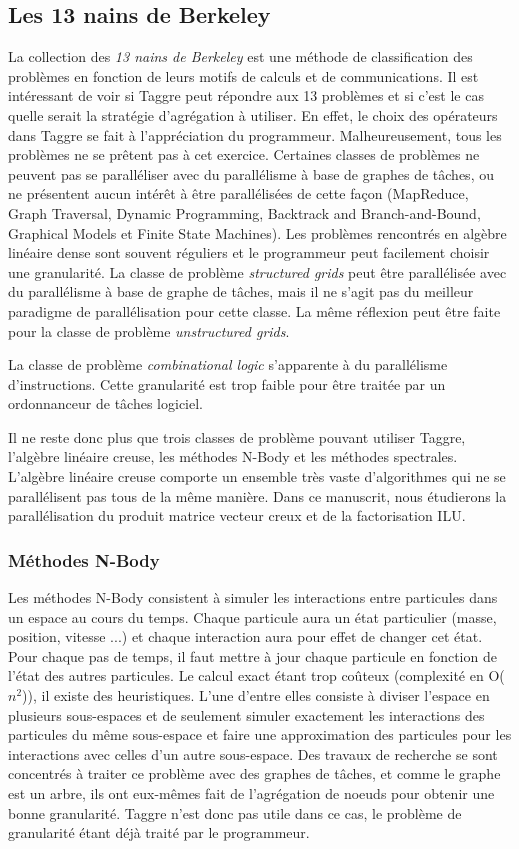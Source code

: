 \subsection{Les 13 nains de Berkeley}
La collection des {\em 13 nains de Berkeley}\cite{dwarfs} est une méthode de classification des problèmes en fonction de leurs motifs de calculs et de communications.
%
Il est intéressant de voir si Taggre peut répondre aux 13 problèmes et si c'est le cas quelle serait la stratégie d'agrégation à utiliser.
%
En effet, le choix des opérateurs dans Taggre se fait à l'appréciation du programmeur.
%
Malheureusement, tous les problèmes ne se prêtent pas à cet exercice.
%
Certaines classes de problèmes ne peuvent pas se paralléliser avec du parallélisme à base de graphes de tâches, ou ne présentent aucun intérêt à être parallélisées de cette façon (MapReduce, Graph Traversal, Dynamic Programming, Backtrack and Branch-and-Bound, Graphical Models et Finite State Machines).
%
Les problèmes rencontrés en algèbre linéaire dense sont souvent réguliers et le programmeur peut facilement choisir une granularité.
%
La classe de problème {\em structured grids} peut être parallélisée avec du parallélisme à base de graphe de tâches, mais il ne s'agit pas du meilleur paradigme de parallélisation pour cette classe.
%
La même réflexion peut être faite pour la classe de problème {\em unstructured grids}.


La classe de problème {\em combinational logic} s'apparente à du parallélisme d'instructions.
%
Cette granularité est trop faible pour être traitée par un ordonnanceur de tâches logiciel.

Il ne reste donc plus que trois classes de problème pouvant utiliser Taggre, l'algèbre linéaire creuse, les méthodes N-Body et les méthodes spectrales.
%
L'algèbre linéaire creuse comporte un ensemble très vaste d'algorithmes qui ne se parallélisent pas tous de la même manière.
%
Dans ce manuscrit, nous étudierons la parallélisation du produit matrice vecteur creux et de la factorisation ILU.


\subsubsection{Méthodes N-Body}
Les méthodes N-Body consistent à simuler les interactions entre particules dans un espace au cours du temps.
%
Chaque particule aura un état particulier (masse, position, vitesse ...) et chaque interaction aura pour effet de changer cet état.
%
Pour chaque pas de temps, il faut mettre à jour chaque particule en fonction de l'état des autres particules.
%
Le calcul exact étant trop coûteux (complexité en O($n^2$)), il existe des heuristiques.
%
L'une d'entre elles consiste à diviser l'espace en plusieurs sous-espaces et de seulement simuler exactement les interactions des particules du même sous-espace et faire une approximation des particules pour les interactions avec celles d'un autre sous-espace.
%
Des travaux de recherche se sont concentrés à traiter ce problème avec des graphes de tâches\cite{scalfmm}, et comme le graphe est un arbre, ils ont eux-mêmes fait de l'agrégation de noeuds pour obtenir une bonne granularité.
%
Taggre n'est donc pas utile dans ce cas, le problème de granularité étant déjà traité par le programmeur.


